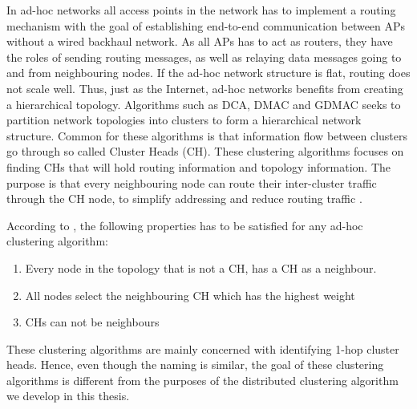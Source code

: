 In ad-hoc networks all access points in the network has to implement a routing mechanism with the goal of establishing end-to-end communication 
between APs without a wired backhaul network. As all APs has to act as routers, they have the roles of sending routing messages, as well as relaying data messages
going to and from neighbouring nodes. If the ad-hoc network structure is flat, routing does not scale well. Thus, just as the Internet, ad-hoc networks benefits
from creating a hierarchical topology. Algorithms such as DCA, DMAC  and GDMAC \cite{Basagni} seeks to partition network topologies into clusters to form a hierarchical network structure.
Common for these algorithms is that information flow between clusters go through so called Cluster Heads (CH). These clustering algorithms focuses on finding CHs that will hold routing information and topology information. The purpose is that every neighbouring node can route their inter-cluster traffic through the CH node, to simplify addressing and reduce routing traffic \cite{Mamalis}.

According to \cite{Basagni} , the following properties has to be satisfied for any ad-hoc clustering algorithm:
\begin{enumerate}
	\item Every node in the topology that is not a CH, has a CH as a neighbour.
	\item All nodes select the neighbouring CH which has the highest weight
	\item CHs can not be neighbours
\end{enumerate}

These clustering algorithms are mainly concerned with identifying 1-hop cluster heads. Hence, even though the naming is similar, the goal of these clustering algorithms is
different from the purposes of the distributed clustering algorithm we develop in this thesis.





